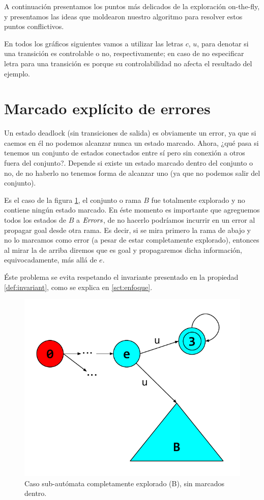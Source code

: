 A continuación presentamos los puntos más delicados de la exploración on-the-fly, y presentamos las ideas que moldearon nuestro algoritmo para resolver estos puntos conflictivos.

En todos los gráficos siguientes vamos a utilizar las letras $c$, $u$, para denotar si una transición es controlable o no, respectivamente; en caso de no especificar letra para una transición es porque su controlabilidad no afecta el resultado del ejemplo.

\section{Marcado explícito de errores}\label{marcarErrores}

Un estado deadlock (sin transiciones de salida) es obviamente un error, ya que si caemos en él no podemos alcanzar nunca un estado marcado. Ahora, ¿qué pasa si tenemos un conjunto de estados conectados entre sí pero sin conexión a otros fuera del conjunto?. Depende si existe un estado marcado dentro del conjunto o no, de no haberlo no tenemos forma de alcanzar uno (ya que no podemos salir del conjunto). 

Es el caso de la figura \ref{fig:falenciasErrores}, el conjunto o rama $B$ fue totalmente explorado y no contiene ningún estado marcado. En éste momento es importante que agreguemos todos los estados de $B$ a $\mathit{Errors}$, de no hacerlo podríamos incurrir en un error al propagar goal desde otra rama. Es decir, si se mira primero la rama de abajo y no lo marcamos como error (a pesar de estar completamente explorado), entonces al mirar la de arriba diremos que es goal y propagaremos dicha información, equivocadamente, más allá de $e$. 

Éste problema se evita respetando el invariante presentado en la propiedad \ref{def:invariant}, como se explica en \ref{sct:enfoque}.

\begin{figure}[htb]
	\centering
	\includegraphics[width=\linewidth/2]{figures/FalenciasErrores.pdf}
	\caption{Caso sub-autómata completamente explorado (B), sin marcados dentro.}
	\label{fig:falenciasErrores}
\end{figure}

